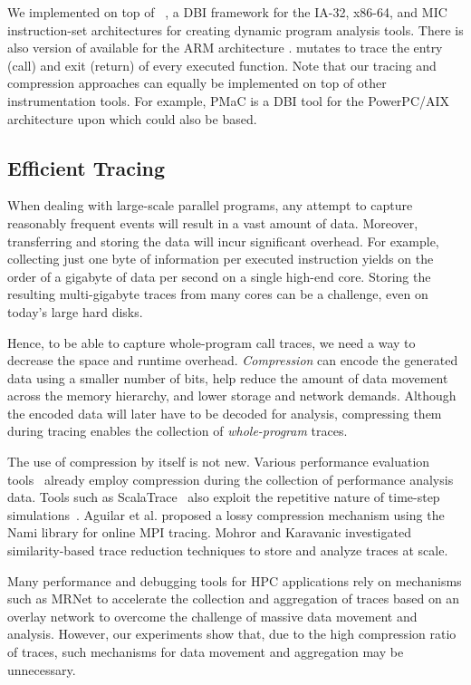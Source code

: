 %


We implemented \parlot on top of \pin~\cite{pin}, a DBI framework for the IA-32, x86-64, and MIC instruction-set architectures for creating dynamic program analysis tools. There is also version of \pin available for the ARM architecture \cite{pinarm}. \parlot mutates \pin to trace the entry (call) and exit (return) of every executed function. Note that our tracing and compression approaches can equally be implemented on top of other instrumentation tools. For example, PMaC \cite{pmac} is a DBI tool for the PowerPC/AIX architecture upon which \parlot could also be based.


\subsection{Efficient Tracing}
When dealing with large-scale parallel programs, any attempt to capture reasonably frequent events will result in a vast amount of data. Moreover, transferring and storing the data will incur significant overhead. For example, collecting just one byte of information per executed instruction yields on the order of a gigabyte of data per second on a single high-end core. Storing the resulting multi-gigabyte traces from many cores can be a challenge, even on today's large hard disks.

Hence, to be able to capture whole-program call traces, we need a way to decrease the space and runtime overhead. \textit{Compression} can encode the generated data using a smaller number of bits, help
reduce the amount of data movement across the memory hierarchy, and
lower storage and network demands.
%
Although the encoded data will later have to be decoded for analysis, compressing them during tracing enables the collection of {\em whole-program} traces.

The use of compression by itself is not new.
Various performance evaluation tools~\cite{tau,scorep,eventflowgraph}
already employ compression during the collection
of performance analysis data.
%
Tools such as ScalaTrace~\cite{scalatrace}
also exploit
the repetitive nature of time-step simulations~\cite{freitag}. Aguilar et al. \cite{eventflowgraph} proposed a lossy compression mechanism using the Nami library \cite{gamblinNami} for online MPI tracing. Mohror and Karavanic \cite{mohror} investigated similarity-based trace reduction techniques to store and analyze traces at scale.


Many performance and debugging tools for HPC applications \cite{stat,taumrnet} rely on mechanisms such as MRNet \cite{mrnet} to accelerate the collection and aggregation of traces based on an overlay network to overcome the challenge of massive data movement and analysis. However, our experiments show that, due to the high compression ratio of \parlot traces, such mechanisms for data movement and aggregation may be unnecessary.

